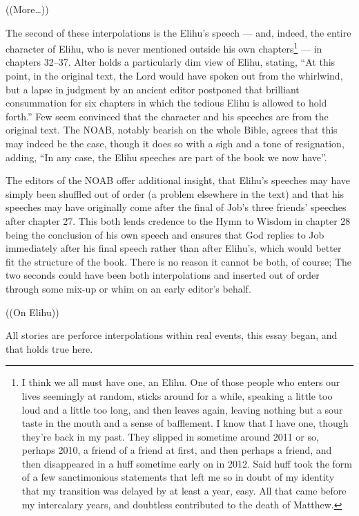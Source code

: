 ((More\ldots))

The second of these interpolations is the Elihu's speech --- and, indeed, the entire character of Elihu, who is never mentioned outside his own chapters\footnote{I think we all must have one, an Elihu. One of those people who enters our lives seemingly at random, sticks around for a while, speaking a little too loud and a little too long, and then leaves again, leaving nothing but a sour taste in the mouth and a sense of bafflement. I know that I have one, though they're back in my past. They slipped in sometime around 2011 or so, perhaps 2010, a friend of a friend at first, and then perhaps a friend, and then disappeared in a huff sometime early on in 2012. Said huff took the form of a few sanctimonious statements that left me so in doubt of my identity that my transition was delayed by at least a year, easy. All that came before my intercalary years, and doubtless contributed to the death of Matthew.} --- in chapters 32--37. Alter holds a particularly dim view of Elihu, stating, ``At this point, in the original text, the Lord would have spoken out from the whirlwind, but a lapse in judgment by an ancient editor postponed that brilliant consummation for six chapters in which the tedious Elihu is allowed to hold forth.'' \parencite[460]{alter} Few seem convinced that the character and his speeches are from the original text. The NOAB, notably bearish on the whole Bible, agrees that this may indeed be the case, though it does so with a sigh and a tone of resignation, adding, ``In any case, the Elihu speeches are part of the book we now have''. \parencite[767]{noab}

The editors of the NOAB offer additional insight, that Elihu's speeches may have simply been shuffled out of order (a problem elsewhere in the text) and that his speeches may have originally come after the final of Job's three friends' speeches after chapter 27. This both lends credence to the Hymn to Wisdom in chapter 28 being the conclusion of his own speech and ensures that God replies to Job immediately after his final speech rather than after Elihu's, which would better fit the structure of the book. There is no reason it cannot be both, of course; The two seconds could have been both interpolations and inserted out of order through some mix-up or whim on an early editor's behalf.

((On Elihu))

All stories are perforce interpolations within real events, this essay began, and that holds true here.

